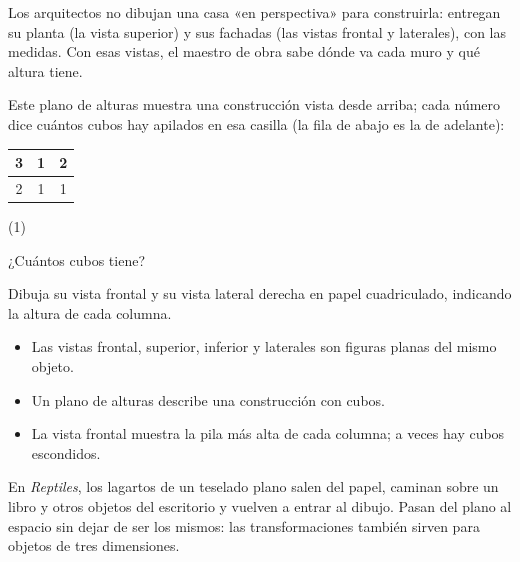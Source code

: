 \documentclass[11pt]{article}
\begin{document}
\begin{aplicacion}
Los arquitectos no dibujan una casa «en perspectiva» para construirla: entregan su planta (la
vista superior) y sus fachadas (las vistas frontal y laterales), con las medidas. Con esas
vistas, el maestro de obra sabe dónde va cada muro y qué altura tiene.
\end{aplicacion}

\begin{preguntas}
\pregunta Este plano de alturas muestra una construcción vista desde arriba; cada número dice
cuántos cubos hay apilados en esa casilla (la fila de abajo es la de adelante):
\begin{center}
\renewcommand{\arraystretch}{1.3}
\begin{tabular}{|c|c|c|}\hline 3 & 1 & 2\\\hline 2 & 1 & 1\\\hline\end{tabular}
\end{center}
\begin{opciones*}(1)
  \item ¿Cuántos cubos tiene?
  \item Dibuja su vista frontal y su vista lateral derecha en papel cuadriculado, indicando la
        altura de cada columna.
\end{opciones*}
\espacio{3.5cm}
\end{preguntas}

\begin{resumen}
\begin{itemize}
  \item Las vistas frontal, superior, inferior y laterales son figuras planas del mismo objeto.
  \item Un plano de alturas describe una construcción con cubos.
  \item La vista frontal muestra la pila más alta de cada columna; a veces hay cubos escondidos.
\end{itemize}
\end{resumen}

\label{tema:objetostransformados}

\begin{hilo}
En \emph{Reptiles}, los lagartos de un teselado plano salen del papel, caminan sobre un libro y
otros objetos del escritorio y vuelven a entrar al dibujo. Pasan del plano al espacio sin dejar
de ser los mismos: las transformaciones también sirven para objetos de tres dimensiones.
\end{hilo}
\end{document}
